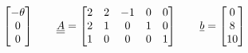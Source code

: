 \documentclass[11pt, oneside]{article}
\begin{document}
\begin{enumerate}
\begin{enumerate}
\begin{align*}
\begin{bmatrix}
            -\theta \\
            0 \\
            0
          \end{bmatrix} \qquad
          \underline{\underline{A}} =
          \begin{bmatrix}
            2 & 2 & -1 & 0 & 0 \\
            2 & 1 & 0 & 1 & 0 \\
            1 & 0 & 0 & 0 & 1
          \end{bmatrix} \qquad
          \underline{b} =
          \begin{bmatrix}
            0 \\
            8 \\
            10
          \end{bmatrix}
        \end{align*}


\end{enumerate}
\end{enumerate}
\end{document}
